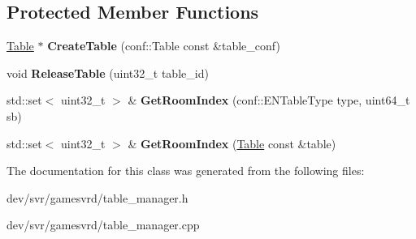 \subsection*{Protected Member Functions}
\begin{DoxyCompactItemize}
\item 
\hypertarget{classTableManager_a78a56fd0695d35eec2690a616128c53c}{
\hyperlink{classTable}{Table} $\ast$ {\bfseries CreateTable} (conf::Table const \&table\_\-conf)}
\label{classTableManager_a78a56fd0695d35eec2690a616128c53c}

\item 
\hypertarget{classTableManager_a6a986a40ab8d42c8850439b496286a86}{
void {\bfseries ReleaseTable} (uint32\_\-t table\_\-id)}
\label{classTableManager_a6a986a40ab8d42c8850439b496286a86}

\item 
\hypertarget{classTableManager_ae2ee1ee27de259dadb61a3bd56f0a179}{
std::set$<$ uint32\_\-t $>$ \& {\bfseries GetRoomIndex} (conf::ENTableType type, uint64\_\-t sb)}
\label{classTableManager_ae2ee1ee27de259dadb61a3bd56f0a179}

\item 
\hypertarget{classTableManager_afc7c9bb919bd5dab04a6c33644c0e739}{
std::set$<$ uint32\_\-t $>$ \& {\bfseries GetRoomIndex} (\hyperlink{classTable}{Table} const \&table)}
\label{classTableManager_afc7c9bb919bd5dab04a6c33644c0e739}

\end{DoxyCompactItemize}


The documentation for this class was generated from the following files:\begin{DoxyCompactItemize}
\item 
dev/svr/gamesvrd/table\_\-manager.h\item 
dev/svr/gamesvrd/table\_\-manager.cpp\end{DoxyCompactItemize}
